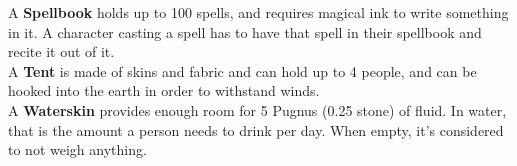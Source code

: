 A \textbf{Spellbook} holds up to 100 spells, and requires magical ink to write something in it. A character casting a spell has to have that spell in their spellbook and recite it out of it.\\

A \textbf{Tent} is made of skins and fabric and can hold up to 4 people, and can be hooked into the earth in order to withstand winds.\\

A \textbf{Waterskin} provides enough room for 5 Pugnus (0.25 stone) of fluid. In water, that is the amount a person needs to drink per day. When empty, it's considered to not weigh anything.\\
